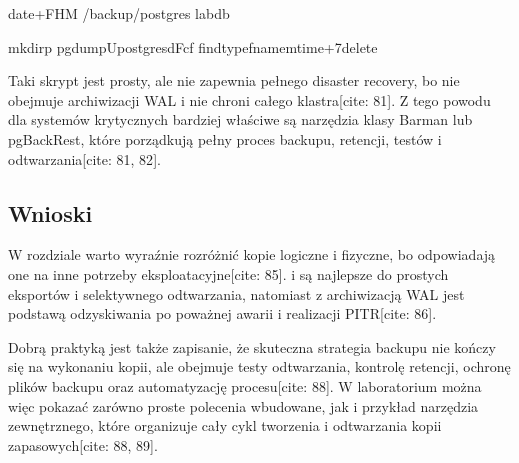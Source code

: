 \documentclass[letterpaper,10pt,polish]{sphinxmanual}
\begin{document}
\begin{sphinxVerbatim}[commandchars=\\\{\}]
date+\PYGZpc{}F\PYGZus{}\PYGZpc{}H\PYGZhy{}\PYGZpc{}M
/backup/postgres
labdb

mkdir\PYGZhy{}p
pg\PYGZus{}dump\PYGZhy{}Upostgres\PYGZhy{}d\PYGZhy{}Fc\PYGZhy{}f
find\PYGZhy{}typef\PYGZhy{}name\PYGZhy{}mtime+7\PYGZhy{}delete
\end{sphinxVerbatim}

\sphinxAtStartPar
Taki skrypt jest prosty, ale nie zapewnia pełnego disaster recovery, bo nie obejmuje archiwizacji WAL i nie chroni całego klastra{[}cite: 81{]}. Z tego powodu dla systemów krytycznych bardziej właściwe są narzędzia klasy Barman lub pgBackRest, które porządkują pełny proces backupu, retencji, testów i odtwarzania{[}cite: 81, 82{]}.


\subsection{Wnioski}
\label{\detokenize{rozdzial_2/rozdzial_28/index:wnioski}}
\sphinxAtStartPar
W rozdziale warto wyraźnie rozróżnić kopie logiczne i fizyczne, bo odpowiadają one na inne potrzeby eksploatacyjne{[}cite: 85{]}.  i  są najlepsze do prostych eksportów i selektywnego odtwarzania, natomiast  z archiwizacją WAL jest podstawą odzyskiwania po poważnej awarii i realizacji PITR{[}cite: 86{]}.

\sphinxAtStartPar
Dobrą praktyką jest także zapisanie, że skuteczna strategia backupu nie kończy się na wykonaniu kopii, ale obejmuje testy odtwarzania, kontrolę retencji, ochronę plików backupu oraz automatyzację procesu{[}cite: 88{]}. W laboratorium można więc pokazać zarówno proste polecenia wbudowane, jak i przykład narzędzia zewnętrznego, które organizuje cały cykl tworzenia i odtwarzania kopii zapasowych{[}cite: 88, 89{]}.
\end{document}
